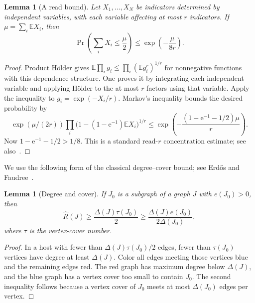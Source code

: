 \documentclass[11pt]{amsart}
\newtheorem{lemma}[theorem]{Lemma}
\theoremstyle{definition}
\theoremstyle{remark}
\numberwithin{equation}{section}
\newcommand{\e}{\mathrm e}
\begin{document}
\begin{lemma}[A read bound]\label{lem:read-bound}
Let $X_1,\ldots,X_N$ be indicators determined by independent variables,
with each variable affecting at most $r$ indicators. If
$\mu=\sum_i\mathbb E X_i$, then
\[
 \Pr\left(\sum_iX_i\le\frac\mu2\right)
 \le\exp\left(-\frac\mu{8r}\right).
\]
\end{lemma}
\begin{proof}
Product H\"older gives
$\mathbb E\prod_i g_i\le\prod_i(\mathbb E g_i^r)^{1/r}$ for nonnegative
functions with this dependence structure. One proves it by integrating
each independent variable and applying H\"older to the at most $r$ factors
using that variable. Apply the inequality to $g_i=\exp(-X_i/r)$.
Markov's inequality bounds the desired probability by
\[
 \exp(\mu/(2r))
 \prod_i\bigl(1-(1-\e^{-1})\mathbb E X_i\bigr)^{1/r}
 \le \exp\left(-\frac{(1-\e^{-1}-1/2)\mu}{r}\right).
\]
Now $1-\e^{-1}-1/2>1/8$. This is a standard read-$ r$ concentration
estimate; see also~\cite{GLSS}.
\end{proof}

We use the following form of the classical degree--cover bound; see
Erd\H{o}s and Faudree~\cite[inequality~(7)]{EF92}.

\begin{lemma}[Degree and cover]\label{lem:degree-cover}
If $J_0$ is a subgraph of a graph $ J $ with $ e(J_0)>0$, then
\[
 \widehat R(J)\ge\frac{\Delta(J)\tau(J_0)}2
 \ge\frac{\Delta(J)e(J_0)}{2\Delta(J_0)},
\]
where $\tau$ is the vertex-cover number.
\end{lemma}
\begin{proof}
In a host with fewer than $\Delta(J)\tau(J_0)/2$ edges, fewer than
$\tau(J_0)$ vertices have degree at least $\Delta(J)$. Color all edges
meeting those vertices blue and the remaining edges red. The red graph
has maximum degree below $\Delta(J)$, and the blue graph has a vertex
cover too small to contain $J_0$. The second inequality follows because
a vertex cover of $J_0$ meets at most $\Delta(J_0)$ edges per vertex.
\end{proof}
\end{document}
